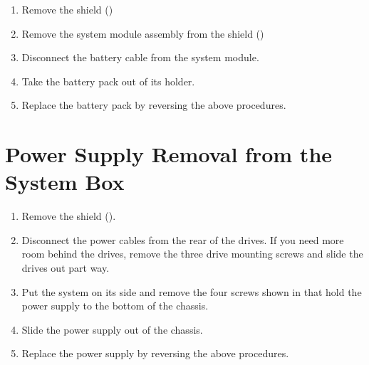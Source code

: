 \begin{enumerate}

\item	Remove the shield ()

\item	Remove the system module assembly from the shield ()

\item	Disconnect the battery cable from the system module.


\item	Take the battery pack out of its holder.

\item	Replace the battery pack by reversing the above procedures.


\end{enumerate}

\newpage

\section{Power Supply Removal from the System Box}

\begin{enumerate}
\item	Remove the shield ().

\item	Disconnect the power cables from the rear of the drives. If you need
		more room behind the drives, remove the three drive mounting screws
		and slide the drives out part way.

\item	Put the system on its side and remove the four screws shown in
		 that hold the power supply to the bottom of the chassis.

\newpage
\item	Slide the power supply out of the chassis.

\item	Replace the power supply by reversing the above procedures.

\end{enumerate}

